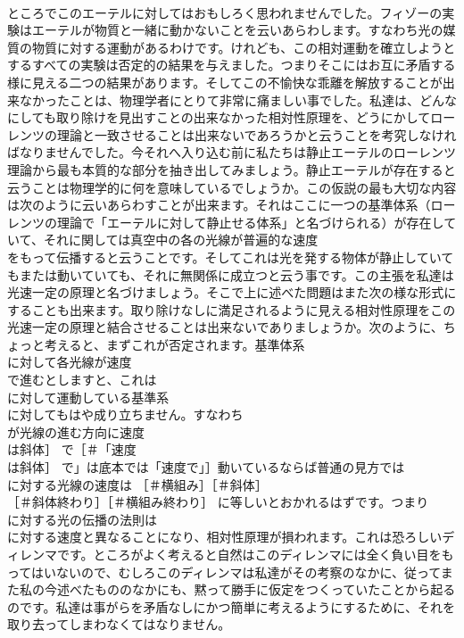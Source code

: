 \documentclass[8pt]{extreport}
\begin{document}
\begin{CJK}{UTF8}{min}
\\	ところでこのエーテルに対してはおもしろく思われませんでした。フィゾーの実験はエーテルが物質と一緒に動かないことを云いあらわします。すなわち光の媒質の物質に対する運動があるわけです。けれども、この相対運動を確立しようとするすべての実験は否定的の結果を与えました。つまりそこにはお互に矛盾する様に見える二つの結果があります。そしてこの不愉快な乖離を解放することが出来なかったことは、物理学者にとりて非常に痛ましい事でした。私達は、どんなにしても取り除けを見出すことの出来なかった相対性原理を、どうにかしてローレンツの理論と一致させることは出来ないであろうかと云うことを考究しなければなりませんでした。今それへ入り込む前に私たちは静止エーテルのローレンツ理論から最も本質的な部分を抽き出してみましょう。静止エーテルが存在すると云うことは物理学的に何を意味しているでしょうか。この仮説の最も大切な内容は次のように云いあらわすことが出来ます。それはここに一つの基準体系（ローレンツの理論で「エーテルに対して静止せる体系」と名づけられる）が存在していて、それに関しては真空中の各の光線が普遍的な速度 
\\	をもって伝播すると云うことです。そしてこれは光を発する物体が静止していてもまたは動いていても、それに無関係に成立つと云う事です。この主張を私達は光速一定の原理と名づけましょう。そこで上に述べた問題はまた次の様な形式にすることも出来ます。取り除けなしに満足されるように見える相対性原理をこの光速一定の原理と結合させることは出来ないでありましょうか。次のように、ちょっと考えると、まずこれが否定されます。基準体系 
\\	に対して各光線が速度 
\\	で進むとしますと、これは 
\\	に対して運動している基準系 
\\	に対してもはや成り立ちません。すなわち 
\\	が光線の進む方向に速度 
\\	は斜体］ で［＃「速度 
\\	は斜体］ で」は底本では「速度で」］動いているならば普通の見方では 
\\	に対する光線の速度は ［＃横組み］［＃斜体］
\\	［＃斜体終わり］［＃横組み終わり］ に等しいとおかれるはずです。つまり 
\\	に対する光の伝播の法則は 
\\	に対する速度と異なることになり、相対性原理が損われます。これは恐ろしいディレンマです。ところがよく考えると自然はこのディレンマには全く負い目をもってはいないので、むしろこのディレンマは私達がその考察のなかに、従ってまた私の今述べたもののなかにも、黙って勝手に仮定をつくっていたことから起るのです。私達は事がらを矛盾なしにかつ簡単に考えるようにするために、それを取り去ってしまわなくてはなりません。

\end{CJK}
\end{document}
